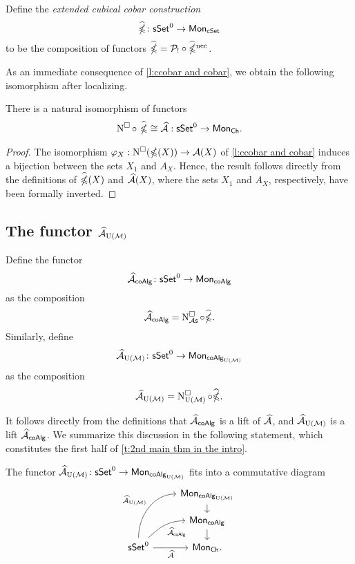 Define the \textit{extended cubical cobar construction}
\begin{equation*}
\widehat{\ccobar} \colon \sSet^0 \to \Mon_{\cSet}
\end{equation*}
to be the composition of functors $\widehat{\ccobar} = \mathcal{P}_{!} \circ \ncobarE$. 

As an immediate consequence of \cref{l:ccobar and cobar}, we obtain the following isomorphism after localizing. 

\begin{corollary}
	There is a natural isomorphism of functors
	$$\cchains \circ\ \widehat{\ccobar} \cong \Ahat :\sSet^0 \to \Mon_{\Ch}.$$
\end{corollary}
\begin{proof}
The isomorphism $\varphi_X: \cchains(\ccobar(X))\to \A(X)$
of \cref{l:ccobar and cobar} induces a bijection between the sets
$X_1$ and $A_X$.
Hence, the result follows directly from the definitions of  $\ccobarE(X)$ and $\Ahat(X)$, where the sets $X_1$ and $A_X$, respectively, have been formally inverted.
\end{proof}

\subsection{The functor $\Ahat_{\UM}$} \label{s:ahatum}

Define the functor
$$\Ahat_{\coAlg} \colon \sSet^0 \to \Mon_{\coAlg}$$
as the composition
$$\Ahat_{\coAlg} = \cchainsAS \circ \widehat{\ccobar}.$$
Similarly, define
$$\Ahat_{\UM} \colon \sSet^0 \to \Mon_{\coAlg_{\UM}}$$
as the composition
$$\Ahat_{\UM} = \cchainsUM \circ \widehat{\ccobar}.$$

It follows directly from the definitions that $\Ahat_{\coAlg}$ is a lift of $\Ahat$, and $\Ahat_{\UM}$ is a lift $\Ahat_{\coAlg}$. We summarize this discussion in the following statement, which constitutes the first half of \cref{t:2nd main thm in the intro}.
\begin{lemma}

The functor $\Ahat_\UM \colon \sSet^0 \to \Mon_{\coAlg_\UM}$ fits into a commutative diagram
	\begin{equation*}
	\begin{tikzcd}[row sep=small]
	& \Mon_{\coAlg_\UM} \arrow[d] \\
	& \Mon_{\coAlg} \arrow[d] \\
	\sSet^0
	\arrow[r, "\Ahat"', ]
	\arrow[ru, "\Ahat_{\coAlg}"', out=45, in=180] 
	\arrow[ruu, "\Ahat_\UM", out=90, in=180]
	& \Mon_{\Ch}.
	\end{tikzcd}
	\end{equation*}
\end{lemma}

